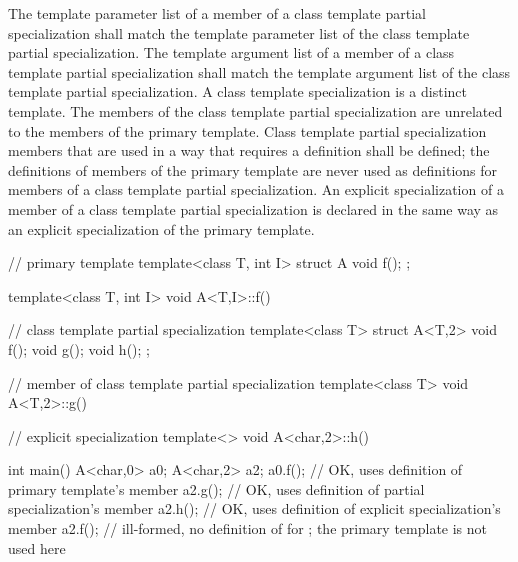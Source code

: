 \pnum
The template parameter list of a member of a class template partial
specialization shall match the template parameter list of the class template
partial specialization.
The template argument list of a member of a class template partial
specialization shall match the template argument list of the class template
partial specialization.
A class template specialization is a distinct template.
The members of the class template partial specialization are
unrelated to the members of the primary template.
Class template partial specialization members that are used in a way that
requires a definition shall be defined; the definitions of members of the
primary template are never used as definitions for members of a class
template partial specialization.
An explicit specialization of a member of a class template partial
specialization is declared in the same way as an explicit specialization of
the primary template.
\begin{example}

\begin{codeblock}
// primary template
template<class T, int I> struct A {
  void f();
};

template<class T, int I> void A<T,I>::f() { }

// class template partial specialization
template<class T> struct A<T,2> {
  void f();
  void g();
  void h();
};

// member of class template partial specialization
template<class T> void A<T,2>::g() { }

// explicit specialization
template<> void A<char,2>::h() { }

int main() {
  A<char,0> a0;
  A<char,2> a2;
  a0.f();           // OK, uses definition of primary template's member
  a2.g();           // OK, uses definition of partial specialization's member
  a2.h();           // OK, uses definition of explicit specialization's member
  a2.f();           // ill-formed, no definition of  for ; the primary template is not used here
}
\end{codeblock}
\end{example}

